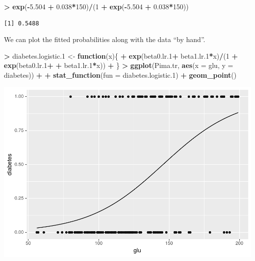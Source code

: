\documentclass[
]{krantz}
\makeatletter
\newenvironment{Shaded}{\begin{snugshade}}{\end{snugshade}}
\newcommand{\ControlFlowTok}[1]{\textcolor[rgb]{0.27,0.27,0.27}{\textbf{#1}}}
\newcommand{\DataTypeTok}[1]{\textcolor[rgb]{0.27,0.27,0.27}{#1}}
\newcommand{\DecValTok}[1]{\textcolor[rgb]{0.06,0.06,0.06}{#1}}
\newcommand{\FloatTok}[1]{\textcolor[rgb]{0.06,0.06,0.06}{#1}}
\newcommand{\KeywordTok}[1]{\textcolor[rgb]{0.27,0.27,0.27}{\textbf{#1}}}
\newcommand{\NormalTok}[1]{#1}
\newcommand{\OperatorTok}[1]{\textcolor[rgb]{0.43,0.43,0.43}{\textbf{#1}}}
\newcommand{\StringTok}[1]{\textcolor[rgb]{0.5,0.5,0.5}{#1}}
\newenvironment{kframe}{%
\medskip{}
\setlength{\fboxsep}{.8em}
 \def\at@end@of@kframe{}%
 \ifinner\ifhmode%
  \def\at@end@of@kframe{\end{minipage}}%
  \begin{minipage}{\columnwidth}%
 \fi\fi%
 \def\FrameCommand##1{\hskip\@totalleftmargin \hskip-\fboxsep
 \colorbox{shadecolor}{##1}\hskip-\fboxsep
     \hskip-\linewidth \hskip-\@totalleftmargin \hskip\columnwidth}%
 \MakeFramed {\advance\hsize-\width
   \@totalleftmargin\z@ \linewidth\hsize
   \@setminipage}}%
 {\par\unskip\endMakeFramed%
 \at@end@of@kframe}
\renewenvironment{Shaded}{\begin{kframe}}{\end{kframe}}
\makeatother
\begin{document}
\begin{Shaded}
\begin{Highlighting}[]
\OperatorTok{\textgreater{}}\StringTok{ }\KeywordTok{exp}\NormalTok{(}\OperatorTok{{-}}\FloatTok{5.504} \OperatorTok{+}\StringTok{ }\FloatTok{0.038}\OperatorTok{*}\DecValTok{150}\NormalTok{)}\OperatorTok{/}\NormalTok{(}\DecValTok{1} \OperatorTok{+}\StringTok{ }\KeywordTok{exp}\NormalTok{(}\OperatorTok{{-}}\FloatTok{5.504} \OperatorTok{+}\StringTok{ }\FloatTok{0.038}\OperatorTok{*}\DecValTok{150}\NormalTok{))}
\end{Highlighting}
\end{Shaded}

\begin{verbatim}
[1] 0.5488
\end{verbatim}

We can plot the fitted probabilities along with the data ``by hand''.

\begin{Shaded}
\begin{Highlighting}[]
\OperatorTok{\textgreater{}}\StringTok{ }\NormalTok{diabetes.logistic}\FloatTok{.1}\NormalTok{ \textless{}{-}}\StringTok{ }\ControlFlowTok{function}\NormalTok{(x)\{}
\OperatorTok{+}\StringTok{   }\KeywordTok{exp}\NormalTok{(beta0.lr}\FloatTok{.1}\OperatorTok{+}\StringTok{ }\NormalTok{beta1.lr}\FloatTok{.1}\OperatorTok{*}\NormalTok{x)}\OperatorTok{/}\NormalTok{(}\DecValTok{1} \OperatorTok{+}\StringTok{ }\KeywordTok{exp}\NormalTok{(beta0.lr}\FloatTok{.1}\OperatorTok{+}\StringTok{ }
\OperatorTok{+}\StringTok{                                            }\NormalTok{beta1.lr}\FloatTok{.1}\OperatorTok{*}\NormalTok{x))}
\OperatorTok{+}\StringTok{ }\NormalTok{\}}
\OperatorTok{\textgreater{}}\StringTok{ }\KeywordTok{ggplot}\NormalTok{(Pima.tr, }\KeywordTok{aes}\NormalTok{(}\DataTypeTok{x =}\NormalTok{ glu, }\DataTypeTok{y =}\NormalTok{ diabetes)) }\OperatorTok{+}\StringTok{ }
\OperatorTok{+}\StringTok{   }\KeywordTok{stat\_function}\NormalTok{(}\DataTypeTok{fun =}\NormalTok{ diabetes.logistic}\FloatTok{.1}\NormalTok{) }\OperatorTok{+}\StringTok{ }\KeywordTok{geom\_point}\NormalTok{()}
\end{Highlighting}
\end{Shaded}

\includegraphics{bookdown_files/figure-latex/unnamed-chunk-239-1.pdf}
\end{document}

